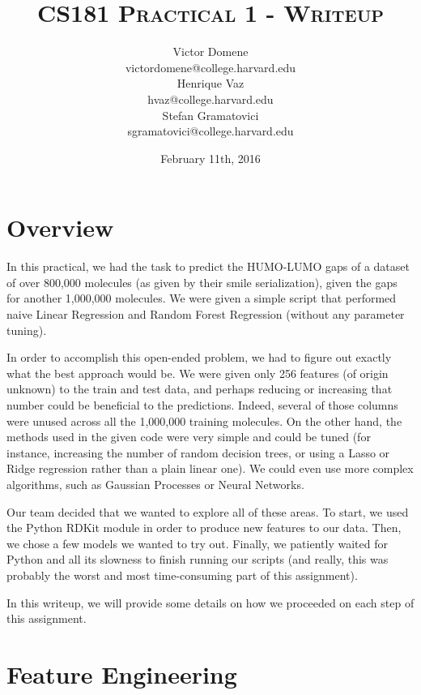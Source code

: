 \documentclass[10pt]{article}
\title{{\textsc{CS181 Practical 1 - Writeup}}}
\author{Victor Domene \\ \small{victordomene@college.harvard.edu} \\
Henrique Vaz \\ \small{hvaz@college.harvard.edu} \\
Stefan Gramatovici \\ \small{sgramatovici@college.harvard.edu}}
\date{February 11th, 2016}
\begin{document}
\hypersetup{linkcolor = black, urlcolor = blue}

\maketitle

\tableofcontents

\newpage

\section{Overview}

In this practical, we had the task to predict the HUMO-LUMO gaps of a dataset
of over 800,000 molecules (as given by their smile serialization), given the
gaps for another 1,000,000 molecules. We were given a simple script that
performed naive Linear Regression and Random Forest Regression (without any
parameter tuning). 

\medskip

In order to accomplish this open-ended problem, we had to figure out exactly
what the best approach would be. We were given only 256 features (of origin
unknown) to the train and test data, and perhaps reducing or increasing
that number could be beneficial to the predictions. Indeed, several of those
columns were unused across all the 1,000,000 training molecules. On the other
hand, the methods used in the given code were very simple and could be tuned
(for instance, increasing the number of random decision trees, or using a
 Lasso or Ridge regression rather than a plain linear one). We could even use
more complex algorithms, such as Gaussian Processes or Neural Networks.

\medskip

Our team decided that we wanted to explore all of these areas. To start, we
used the Python RDKit module in order to produce new features to our data. Then,
we chose a few models we wanted to try out. Finally, we patiently waited for
Python and all its slowness to finish running our scripts (and really, this
was probably the worst and most time-consuming part of this assignment).

\medskip

In this writeup, we will provide some details on how we proceeded on each step
of this assignment.

\section{Feature Engineering}
\end{document}
